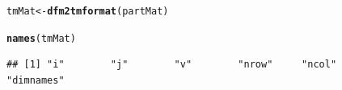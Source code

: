 \documentclass[11pt]{article}\usepackage[]{graphicx}\usepackage[]{color}
\makeatletter
\newcommand{\hlstd}[1]{\textcolor[rgb]{0.345,0.345,0.345}{#1}}%
\newcommand{\hlkwb}[1]{\textcolor[rgb]{0.69,0.353,0.396}{#1}}%
\newcommand{\hlkwd}[1]{\textcolor[rgb]{0.737,0.353,0.396}{\textbf{#1}}}%
\newenvironment{kframe}{%
 \def\at@end@of@kframe{}%
 \ifinner\ifhmode%
  \def\at@end@of@kframe{\end{minipage}}%
  \begin{minipage}{\columnwidth}%
 \fi\fi%
 \def\FrameCommand##1{\hskip\@totalleftmargin \hskip-\fboxsep
 \colorbox{shadecolor}{##1}\hskip-\fboxsep
     \hskip-\linewidth \hskip-\@totalleftmargin \hskip\columnwidth}%
 \MakeFramed {\advance\hsize-\width
   \@totalleftmargin\z@ \linewidth\hsize
   \@setminipage}}%
 {\par\unskip\endMakeFramed%
 \at@end@of@kframe}
\newenvironment{knitrout}{}{} %
\makeatother
\begin{document}
\begin{knitrout}\footnotesize
{}\color{fgcolor}\begin{kframe}
\begin{alltt}
\hlstd{tmMat}\hlkwb{<-} \hlkwd{dfm2tmformat}\hlstd{(partMat)}
\end{alltt}


{\ttfamily\noindent\itshape\color{messagecolor}{\#\# Loading required package: slam\\\#\# Loading required package: tm\\\#\# Loading required package: NLP}}\begin{alltt}
\hlkwd{names}\hlstd{(tmMat)}
\end{alltt}
\begin{verbatim}
## [1] "i"        "j"        "v"        "nrow"     "ncol"     "dimnames"
\end{verbatim}
\end{kframe}
\end{knitrout}



\end{document}
